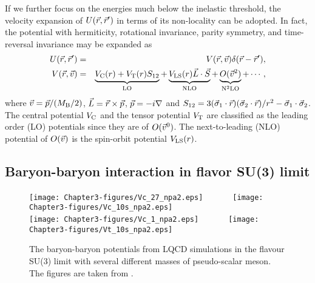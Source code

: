   If we further focus on the 
  energies  much below  the inelastic threshold,
   the velocity expansion
   of $U(\vec{r},\vec{r}')$ in terms of its  non-locality can be adopted.
   In fact, the potential with hermiticity, 
   rotational invariance, parity symmetry,   and time-reversal invariance may be expanded as \cite{okubo}
\begin{eqnarray} 
\label{eq:U-del}
  U(\vec{r},\vec{r}')    &=& V(\vec{r}, \vec{v}) \delta(\vec{r}-\vec{r}'), \\
 V(\vec{r}, \vec{v})    & =&
   \underbrace{V_{\rm C}(r) + V_{\rm T}(r) S_{12}}_{\rm LO} 
  + \underbrace{V_{\rm LS}(r) {\vec{L}} \cdot {\vec{S}}}_{\rm NLO}  
  +\underbrace{{O}(\vec{v}^2)}_{{\rm N}^2{\rm LO}}
  + \cdots , 
   \label{eq:V-pot}
\end{eqnarray} 
   where $\vec{v} = \vec{p}/(M_{\rm B}/2) $, $\vec{L} = \vec{r} \times \vec{p} $, 
   $\vec{p} = -i \nabla$ and 
   $S_{12}=3(\vec{\sigma}_1 \cdot \vec{r})(\vec{\sigma}_2 \cdot \vec{r})/r^2 - \vec{\sigma}_1 \cdot \vec{\sigma}_2$.
     The central potential $V_{\rm C}$ and 
  the tensor potential $V_{\rm T}$ are classified as
  the leading order (LO) potentials since they
  are of $O(\vec{v}^0)$. The next-to-leading (NLO) potential of  
  $O(\vec{v})$ is the spin-orbit potential  $V_{\rm LS}(r)$. 

\subsection{Baryon-baryon interaction in flavor SU(3) limit}
  
\begin{figure}[t]
\begin{center}
\texttt{[image: Chapter3-figures/Vc\_27\_npa2.eps]}\ \ \ \ \ \ \ 
\texttt{[image: Chapter3-figures/Vc\_10s\_npa2.eps]}\\
\texttt{[image: Chapter3-figures/Vc\_1\_npa2.eps]}\ \ \ \ \ \ \ 
\texttt{[image: Chapter3-figures/Vt\_10s\_npa2.eps]}
 \end{center}
\caption{The baryon-baryon potentials from LQCD simulations in the flavour
SU(3) limit with several different masses of pseudo-scalar meson. 
The figures are taken from \cite{Inoue:2011ai}.
  }
\label{fig:NN-potential}
\end{figure}
  

